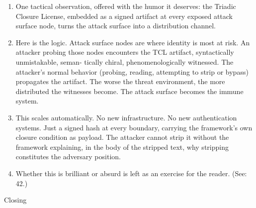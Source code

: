 \documentclass[
]{article}
\begin{document}
\begin{enumerate}
\def\labelenumi{\arabic{enumi}.}
\setcounter{enumi}{260}
\item
  One tactical observation, offered with the humor it deserves: the
  Triadic Closure License, embedded as a signed artifact at every
  exposed attack surface node, turns the attack surface into a
  distribution channel.
\item
  Here is the logic. Attack surface nodes are where identity is most at
  risk. An attacker probing those nodes encounters the TCL artifact,
  syntactically unmistakable, seman- tically chiral, phenomenologically
  witnessed. The attacker's normal behavior (probing, reading,
  attempting to strip or bypass) propagates the artifact. The worse the
  threat environment, the more distributed the witnesses become. The
  attack surface becomes the immune system.
\item
  This scales automatically. No new infrastructure. No new
  authentication systems. Just a signed hash at every boundary, carrying
  the framework's own closure condition as payload. The attacker cannot
  strip it without the framework explaining, in the body of the stripped
  text, why stripping constitutes the adversary position.
\item
  Whether this is brilliant or absurd is left as an exercise for the
  reader. (See: 42.)
\end{enumerate}

Closing
\end{document}
